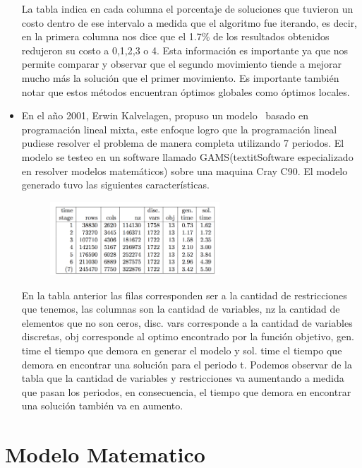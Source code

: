 \documentclass[spanish, fleqn]{article}
\begin{document}
\begin{itemize}
La tabla indica en cada columna el porcentaje de soluciones que tuvieron un costo dentro de ese intervalo a medida que el algoritmo fue iterando, es decir, en la primera columna nos dice que el 1.7$\%$ de los resultados obtenidos redujeron su costo a 0,1,2,3 o 4. Esta información es importante ya que nos permite comparar y observar que el segundo movimiento tiende a mejorar mucho más la solución que el primer movimiento. Es importante también notar que estos métodos encuentran óptimos globales como óptimos locales.

\item En el año 2001, Erwin Kalvelagen, propuso un modelo~\cite{Kalvelagen20031713} basado en programación lineal mixta, este enfoque logro que la programación lineal pudiese resolver el problema de manera completa utilizando 7 periodos. El modelo se testeo en un software llamado GAMS(textit{Software} especializado en resolver modelos matemáticos) sobre una maquina Cray C90. El modelo generado tuvo las siguientes características.


\begin{figure}[!h]
  \centering
    \includegraphics[width=0.6\textwidth]{5}
  \label{fig:DiagramaBarra5}
\end{figure}

En la tabla anterior las filas corresponden ser a la cantidad de restricciones que tenemos, las columnas son la cantidad de variables, nz la cantidad de elementos que no son ceros, disc. vars corresponde a la cantidad de variables discretas, obj corresponde al optimo encontrado por la función objetivo, gen. time el tiempo que demora en generar el modelo y sol. time el tiempo que demora en encontrar una solución para el periodo t. Podemos observar de la tabla que la cantidad de variables y restricciones va aumentando a medida que pasan los periodos, en consecuencia, el tiempo que demora en encontrar una solución también va en aumento.


\end{itemize}

\newpage

\section{Modelo Matematico}
\end{document}
